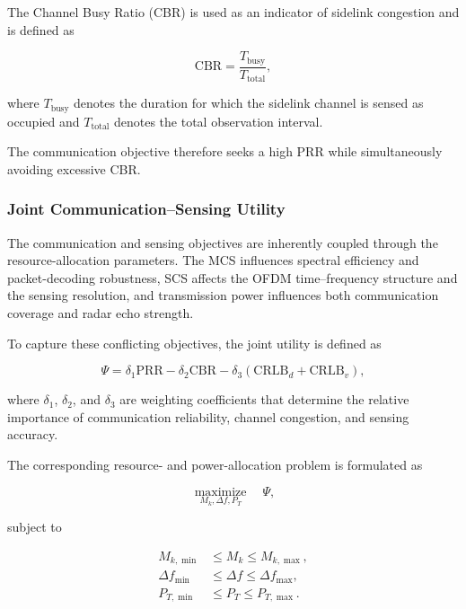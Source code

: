 The Channel Busy Ratio (CBR) is used as an indicator of sidelink
congestion and is defined as

\begin{equation}
\mathrm{CBR}
=
\frac{
T_{\mathrm{busy}}
}{
T_{\mathrm{total}}
},
\label{eq:isac_cbr}
\end{equation}

where $T_{\mathrm{busy}}$ denotes the duration for which the sidelink
channel is sensed as occupied and $T_{\mathrm{total}}$ denotes the total
observation interval.

The communication objective therefore seeks a high PRR while simultaneously
avoiding excessive CBR.

\subsubsection{Joint Communication--Sensing Utility}

The communication and sensing objectives are inherently coupled through
the resource-allocation parameters. The MCS influences spectral efficiency
and packet-decoding robustness, SCS affects the OFDM time--frequency
structure and the sensing resolution, and transmission power influences
both communication coverage and radar echo strength.

To capture these conflicting objectives, the joint utility is defined as

\begin{equation}
\Psi
=
\delta_1
\mathrm{PRR}
-
\delta_2
\mathrm{CBR}
-
\delta_3
\left(
\mathrm{CRLB}_{d}
+
\mathrm{CRLB}_{v}
\right),
\label{eq:isac_joint_utility}
\end{equation}

where $\delta_1$, $\delta_2$, and $\delta_3$ are weighting coefficients
that determine the relative importance of communication reliability,
channel congestion, and sensing accuracy.

The corresponding resource- and power-allocation problem is formulated as

\begin{equation}
\underset{
M_k,\Delta f,P_T
}{
\operatorname{maximize}}
\quad
\Psi,
\label{eq:isac_optimization}
\end{equation}

subject to

\begin{align}
M_{k,\min}
&\leq
M_k
\leq
M_{k,\max},
\label{eq:isac_constraint_mcs}
\\
\Delta f_{\min}
&\leq
\Delta f
\leq
\Delta f_{\max},
\label{eq:isac_constraint_scs}
\\
P_{T,\min}
&\leq
P_T
\leq
P_{T,\max}.
\label{eq:isac_constraint_power}
\end{align}

